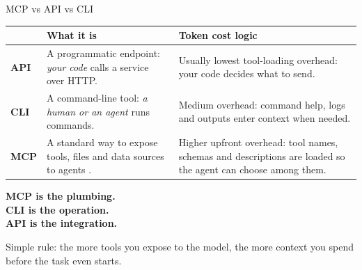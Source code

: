 \begin{frame}{MCP vs API vs CLI}
  \vspace{0.1cm}
  \begin{center}
  \begin{tabularx}{0.94\linewidth}{>{\bfseries\color{deepblue}}lXX}
  \toprule
   & What it is & Token cost logic\\
  \midrule
  API & A programmatic endpoint: \emph{your code} calls a service over HTTP. & Usually lowest tool-loading overhead: your code decides what to send.\\
  CLI & A command-line tool: \emph{a human or an agent} runs commands. & Medium overhead: command help, logs and outputs enter context when needed.\\
  MCP & A standard way to expose tools, files and data sources to agents \citep{anthropic_mcp_2024}. & Higher upfront overhead: tool names, schemas and descriptions are loaded so the agent can choose among them.\\
  \bottomrule
  \end{tabularx}
  \end{center}
  \vspace{0.25cm}
  \begin{center}\Large\color{accent}\bfseries MCP is the plumbing.\\CLI is the operation.\\API is the integration.\end{center}
  \vspace{0.15cm}
  \begin{center}\color{muted}Simple rule: the more tools you expose to the model, the more context you spend before the task even starts.\end{center}
\end{frame}

